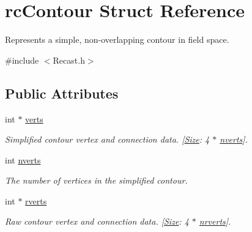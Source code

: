 \hypertarget{structrcContour}{}\section{rc\+Contour Struct Reference}
\label{structrcContour}


Represents a simple, non-\/overlapping contour in field space.  




{\ttfamily \#include $<$Recast.\+h$>$}

\subsection*{Public Attributes}
\begin{DoxyCompactItemize}
\item 
\mbox{\label{structrcContour_a6ab6cd6f3c9a9860ce05defe3c594c9a}} 
int $\ast$ \hyperlink{structrcContour_a6ab6cd6f3c9a9860ce05defe3c594c9a}{verts}
\begin{DoxyCompactList}\small\item\em Simplified contour vertex and connection data. \mbox{[}\hyperlink{classSize}{Size}\+: 4 $\ast$ \hyperlink{structrcContour_afcf77c01352f2c46172fdfabd2f9b9f6}{nverts}\mbox{]}. \end{DoxyCompactList}\item 
\mbox{\label{structrcContour_afcf77c01352f2c46172fdfabd2f9b9f6}} 
int \hyperlink{structrcContour_afcf77c01352f2c46172fdfabd2f9b9f6}{nverts}
\begin{DoxyCompactList}\small\item\em The number of vertices in the simplified contour. \end{DoxyCompactList}\item 
\mbox{\label{structrcContour_a9c329370b7c525e65cec842e78b320e1}} 
int $\ast$ \hyperlink{structrcContour_a9c329370b7c525e65cec842e78b320e1}{rverts}
\begin{DoxyCompactList}\small\item\em Raw contour vertex and connection data. \mbox{[}\hyperlink{classSize}{Size}\+: 4 $\ast$ \hyperlink{structrcContour_a0cceba5f2070c42ac2a871189d4ceb53}{nrverts}\mbox{]}. \end{DoxyCompactList}\item 
\mbox{\label{structrcContour_a0cceba5f2070c42ac2a871189d4ceb53}} 

\end{DoxyCompactItemize}
